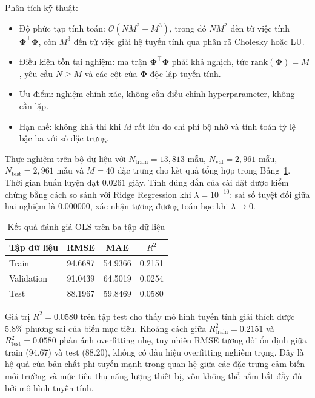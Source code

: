 Phân tích kỹ thuật:
\begin{itemize}[labelsep=10pt, leftmargin=2cm]
    \item Độ phức tạp tính toán: $\mathcal{O}(NM^2 + M^3)$, trong đó $NM^2$ đến từ việc tính $\boldsymbol{\Phi}^{\top}\boldsymbol{\Phi}$, còn $M^3$ đến từ việc giải hệ tuyến tính qua phân rã Cholesky hoặc LU.

    \item Điều kiện tồn tại nghiệm: ma trận $\boldsymbol{\Phi}^{\top}\boldsymbol{\Phi}$ phải khả nghịch, tức $\text{rank}(\boldsymbol{\Phi}) = M$, yêu cầu $N \geq M$ và các cột của $\boldsymbol{\Phi}$ độc lập tuyến tính.

    \item Ưu điểm: nghiệm chính xác, không cần điều chỉnh hyperparameter, không cần lặp.

    \item Hạn chế: không khả thi khi $M$ rất lớn do chi phí bộ nhớ và tính toán tỷ lệ bậc ba với số đặc trưng.
\end{itemize}

Thực nghiệm trên bộ dữ liệu với $N_{\text{train}} = 13{,}813$ mẫu, $N_{\text{val}} = 2{,}961$ mẫu, $N_{\text{test}} = 2{,}961$ mẫu và $M = 40$ đặc trưng cho kết quả tổng hợp trong Bảng~\ref{tab:ols_results}. Thời gian huấn luyện đạt $0.0261$ giây. Tính đúng đắn của cài đặt được kiểm chứng bằng cách so sánh với Ridge Regression khi $\lambda = 10^{-10}$: sai số tuyệt đối giữa hai nghiệm là $0.000000$, xác nhận tương đương toán học khi $\lambda \to 0$.

\begin{table}[H]
\centering
\caption{Kết quả đánh giá OLS trên ba tập dữ liệu}
\label{tab:ols_results}
\begin{tabular}{lccc}
\hline
Tập dữ liệu & RMSE & MAE & $R^2$ \\
\hline
Train       & 94.6687 & 54.9366 & 0.2151 \\
Validation  & 91.0439 & 64.5019 & 0.0254 \\
Test        & 88.1967 & 59.8469 & 0.0580 \\
\hline
\end{tabular}
\end{table}

Giá trị $R^2 = 0.0580$ trên tập test cho thấy mô hình tuyến tính giải thích được 5.8\% phương sai của biến mục tiêu. Khoảng cách giữa $R^2_{\text{train}} = 0.2151$ và $R^2_{\text{test}} = 0.0580$ phản ánh overfitting nhẹ, tuy nhiên RMSE tương đối ổn định giữa train (94.67) và test (88.20), không có dấu hiệu overfitting nghiêm trọng. Đây là hệ quả của bản chất phi tuyến mạnh trong quan hệ giữa các đặc trưng cảm biến môi trường và mức tiêu thụ năng lượng thiết bị, vốn không thể nắm bắt đầy đủ bởi mô hình tuyến tính.

